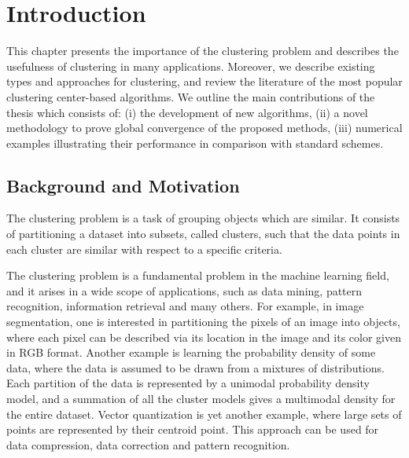  \chapter{Introduction} \label{intro}

\noindent \noindent \hrulefill

This chapter presents the importance of the clustering problem and describes the usefulness of clustering in many applications. Moreover, we describe existing types and approaches for clustering, and review the literature of the most popular clustering center-based algorithms. We outline the main contributions of the thesis which consists of: (i) the development of new algorithms, (ii) a novel methodology to prove global convergence of the proposed methods, (iii) numerical examples illustrating their performance in comparison with standard schemes.

\noindent \noindent \hrulefill

\section{Background and Motivation}

The clustering problem is a task of grouping objects which are similar. It consists of partitioning a dataset into subsets, called clusters, such that the data points in each cluster are similar with respect to a specific criteria. \medskip

The clustering problem is a fundamental problem in the machine learning field, and it arises in a wide scope of applications, such as data mining, pattern recognition, information retrieval and many others. For example, in image segmentation, one is interested in partitioning the pixels of an image into objects, where each pixel can be described via its location in the image and its color given in RGB format. Another example is learning the probability density of some data, where the data is assumed to be drawn from a mixtures of distributions. Each partition of the data is represented by a unimodal probability density model, and a summation of all the cluster models gives a multimodal density for the entire dataset. Vector quantization is yet another example, where large sets of points are represented by their centroid point. This approach can be used for data compression, data correction and pattern recognition.\medskip

